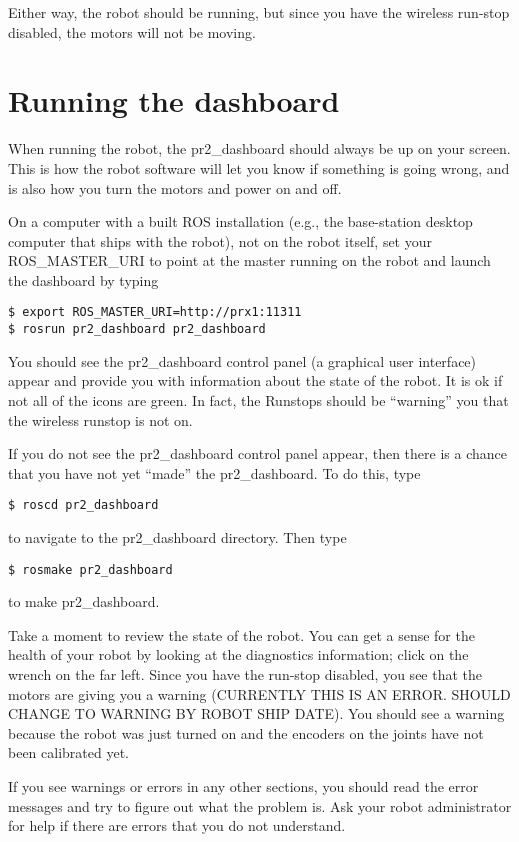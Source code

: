 Either way, the robot should be running, but since you have the wireless run-stop disabled, the motors will not be moving.  

\section{Running the dashboard}
When running the robot, the pr2\_dashboard should always be up on your screen.  This is how the robot software will 
let you know if something is going wrong, and is also how you turn the motors and power on and off.  

On a computer with a built ROS installation (e.g., the base-station desktop computer that ships with the robot), not on the robot itself, set your ROS\_MASTER\_URI to point at the master running on the robot and launch the dashboard by typing
\begin{verbatim}
$ export ROS_MASTER_URI=http://prx1:11311
$ rosrun pr2_dashboard pr2_dashboard
\end{verbatim}
You should see the pr2\_dashboard control panel (a graphical user interface) appear and provide you with information about the state of the robot. It is ok if not all of the icons are green. In fact, the Runstops should be ``warning'' you that the wireless runstop is not on. 

If you do not see the pr2\_dashboard control panel appear, then there is a chance that you have not yet ``made'' the pr2\_dashboard. To do this, type
\begin{verbatim}
$ roscd pr2_dashboard
\end{verbatim}
to navigate to the pr2_dashboard directory. Then type
\begin{verbatim}
$ rosmake pr2_dashboard
\end{verbatim}
to make pr2_dashboard.

Take a moment to review the state of the robot. You can get a sense for the health of 
your robot by looking at the diagnostics information; click on the wrench on the far left.  Since you have the run-stop disabled, you see that the motors are giving you a warning (CURRENTLY THIS IS AN ERROR.  SHOULD CHANGE TO WARNING BY 
ROBOT SHIP DATE).  You should see a warning because the robot was just turned on and the encoders on the joints have not 
been calibrated yet.

If you see warnings or errors in any other sections, you should read the error messages and try to figure out what the 
problem is.  Ask your robot administrator for help if there are errors that you do not understand.

